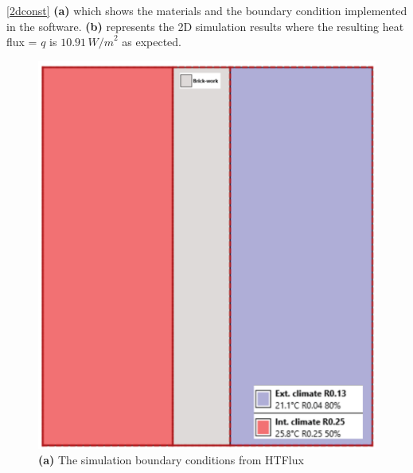  \ref{2dconst} \textbf{(a)} which shows the materials and the boundary condition implemented in the software. \textbf{(b)} represents the 2D simulation results where the resulting heat flux = \( q \) is \( 10.91 \, {W/m}^2 \) as expected.










\begin{figure}[H]
\begin{minipage}{0.49\textwidth}
  \centering
  \includegraphics[width=\linewidth]{Figures/2dconst.png} 
  \caption*{\textbf{(a)} The simulation boundary conditions from HTFlux}
\end{minipage}%
\hspace{0.05\textwidth}
\begin{minipage}{0.49\textwidth}
  \centering

\end{minipage}
\end{figure}
